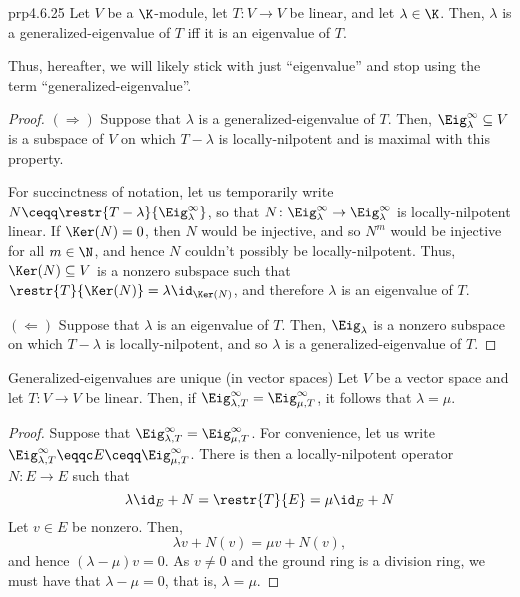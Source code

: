 \begin{prp}{}{prp4.6.25}
	Let $V$ be a $\K$-module, let $T\colon V\rightarrow V$ be linear, and let $\lambda \in \K$.  Then, $\lambda$ is a generalized-eigenvalue of $T$ iff it is an eigenvalue of $T$.
	\begin{rmk}
		Thus, hereafter, we will likely stick with just ``eigenvalue'' and stop using the term ``generalized-eigenvalue''.
	\end{rmk}
	\begin{proof}
		$(\Rightarrow )$ Suppose that $\lambda$ is a generalized-eigenvalue of $T$.  Then, $\Eig _{\lambda}^{\infty}\subseteq V$ is a subspace of $V$ on which $T-\lambda$ is locally-nilpotent and is maximal with this property.
		
		For succinctness of notation, let us temporarily write $N\ceqq \restr{T-\lambda}{\Eig _{\lambda}^{\infty}}$, so that $N\colon \Eig _{\lambda}^{\infty}\rightarrow \Eig _{\lambda}^{\infty}$ is locally-nilpotent linear.  If $\Ker (N)=0$, then $N$ would be injective, and so $N^m$ would be injective for all $m\in \N$, and hence $N$ couldn't possibly be locally-nilpotent.  Thus, $\Ker (N)\subseteq V$ is a nonzero subspace such that $\restr{T}{\Ker (N)}=\lambda \id _{\Ker (N)}$, and therefore $\lambda$ is an eigenvalue of $T$.
		
		\blni
		$(\Leftarrow )$ Suppose that $\lambda$ is an eigenvalue of $T$.  Then, $\Eig _{\lambda}$ is a nonzero subspace on which $T-\lambda$ is locally-nilpotent, and so $\lambda$ is a generalized-eigenvalue of $T$.
	\end{proof}
\end{prp}
\begin{prp}{Generalized-eigenvalues are unique (in vector spaces)}{}
	Let $V$ be a vector space and let $T\colon V\rightarrow V$ be linear.  Then, if $\Eig _{\lambda ,T}^{\infty}=\Eig _{\mu ,T}^{\infty}$, it follows that $\lambda =\mu$.
	\begin{proof}
		Suppose that $\Eig _{\lambda ,T}^{\infty}=\Eig _{\mu ,T}^{\infty}$.  For convenience, let us write $\Eig _{\lambda ,T}^{\infty}\eqqc E\ceqq \Eig _{\mu ,T}^{\infty}$.  There is then a locally-nilpotent operator $N\colon E\rightarrow E$ such that
		\begin{equation}
			\lambda \id _E+N=\restr{T}{E}=\mu \id _E+N
		\end{equation}
		Let $v\in E$ be nonzero.  Then,
		\begin{equation}
			\lambda v+N(v)=\mu v+N(v),
		\end{equation}
		and hence $(\lambda -\mu )v=0$.  As $v\neq 0$ and the ground ring is a division ring, we must have that $\lambda -\mu =0$, that is, $\lambda =\mu$.
	\end{proof}
\end{prp}
